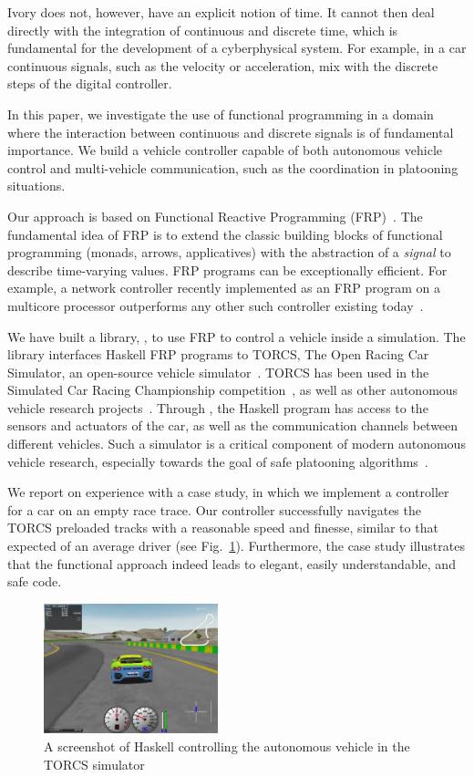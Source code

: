 Ivory does not, however, have an explicit notion of time.
It cannot then deal directly with the integration of 
continuous and discrete time, which is fundamental for the
development of a cyberphysical system. For example,
in a car continuous signals, such as the velocity or acceleration,
mix with the discrete steps of the digital controller.

In this paper, we investigate the use of functional programming
in a domain where the interaction between continuous and discrete signals
is of fundamental importance. We build a vehicle controller capable
of both autonomous vehicle control and multi-vehicle communication,
such as the coordination in platooning situations.

Our approach is based on Functional Reactive Programming
(FRP)~\cite{hudak2003arrows,hudak2000haskell}.
The fundamental idea of FRP is to extend the classic building blocks 
of functional programming (\eg monads, arrows,
applicatives)
with the abstraction of a \emph{signal} to
describe time-varying values. FRP programs can be exceptionally
efficient.  For example, a network controller recently implemented as
an FRP program on a multicore processor outperforms any other such
controller existing today~\cite{Voellmy:2012:SSD:2377677.2377735}.

We have built a library, \ourLib, to use FRP to control a vehicle inside a simulation.
The library interfaces Haskell FRP programs to TORCS, The Open Racing Car Simulator, an open-source vehicle simulator~\cite{torcs}.
TORCS has been used in the Simulated Car Racing Championship competition~\cite{SCRC}, as well as other autonomous vehicle research projects~\cite{xu2016experimental,OnievaPAMP09,conf/cig/CardamoneLL09,conf/cig/MunozGS10}. 
Through \ourLib, the Haskell program has access to the sensors and actuators of the car, as well
as the communication channels between different vehicles.
Such a simulator is a  critical component of modern autonomous vehicle research, especially towards the goal of safe platooning algorithms~\cite{kamali2016formal}.

We report on experience with a case study, in which we implement a controller for a car on an empty race trace. 
Our controller successfully navigates the TORCS preloaded tracks with a reasonable speed and finesse, similar to that expected of an average driver (see Fig.~\ref{fig:race}). 
Furthermore, the case study illustrates that the functional approach indeed leads to elegant, easily understandable, and safe code.

\begin{figure}[t]
\includegraphics[width=0.45\textwidth]{figs/racing.png}
\caption{A screenshot of Haskell controlling the autonomous vehicle in the TORCS simulator}
\label{fig:race}
\end{figure}
